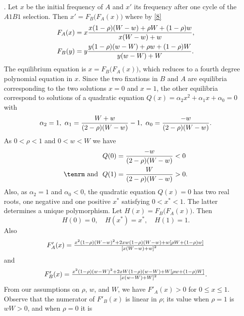 \documentclass[9pt,twocolumn,twoside,lineno]{pnas-new}
\newcommand{\an}[1]{\begin{align}#1\end{align}}
\begin{document}
. Let $x$ be the initial frequency of $A$ and $x'$ its frequency  after one cycle of the $A1B1$ selection. Then $x' =F_B\bigl(F_A(x)\bigr)$ where by \eqref{8}
\begin{equation}
\an{
F_A(x)&=x{x(1-\rho)(W-w) +\rho W+(1-\rho)w\over x(W-w) +w},\\
F_B(y) &= y{y(1-\rho)(w-W) +\rho w+(1-\rho)W\over y(w-W)+W}.}
\label{21}\end{equation}
The equilibrium equation is $x=F_B\bigl(F_A(x)\bigr)$, which reduces to a fourth degree polynomial equation in $x$. Since the two fixations in $B$ and $A$ are equilibria corresponding to the two solutions $x=0$ and $x=1$, the other equilibria correspond to solutions of a quadratic equation $Q(x) =\alpha_2x^2 +\alpha_1x +\alpha_0=0$ with
\begin{equation}\alpha_2=1,\  \alpha_1={W+w\over (2-\rho)(W-w)}-1,\  \alpha_0={-w\over (2-\rho)(W-w)}.\label{22}\end{equation}
As $0<\rho<1$ and $0<w<W$ we have
\begin{equation}
\an{
Q(0) &= {-w\over (2-\rho)(W-w)}<0\\
\hbox{\tenrm and}\ \ Q(1) &={W\over (2-\rho)(W-w)} >0.}\label{23}\end{equation}
Also, as $\alpha_2=1$ and $\alpha_0<0$, the quadratic equation $Q(x)=0$ has two real roots, one negative and one positive $x^*$ satisfying $0<x^*<1$. The latter determines a unique polymorphism. Let $H(x) =F_B\bigl(F_A(x)\bigr)$. Then 
 \begin{equation}H(0)=0,\quad H(x^*)=x^*,\quad H(1)=1.\label{24}\end{equation}
 Also 
\begin{equation}\begin{array}{ccc}
F'_A(x) = {x^2(1-\rho)\left(W-w\right)^2 +2xw(1-\rho)(W-w) +w\left[\rho W +(1-\rho)w\right]\over \left[x(W-w) +w\right]^2}\\
 \end{array}\label{25}\end{equation}
 and
\begin{equation}\begin{array}{ccc}
F'_B(x) = {x^2(1-\rho)\left(w-W\right)^2 +2xW(1-\rho)(w-W) +W\left[\rho w +(1-\rho)W\right]\over \left[x(w-W) +W\right]^2}.\\
\end{array}\label{26}\end{equation}
 From our assumptions on $\rho$, $w$, and $W$, we have $F'_A(x)>0$ for  $0\le x\le 1$. Observe that the numerator of $F'_B(x)$ is linear in $\rho$; its value when $\rho=1$ is $wW>0$, and when $\rho=0$ it is
\end{document}
